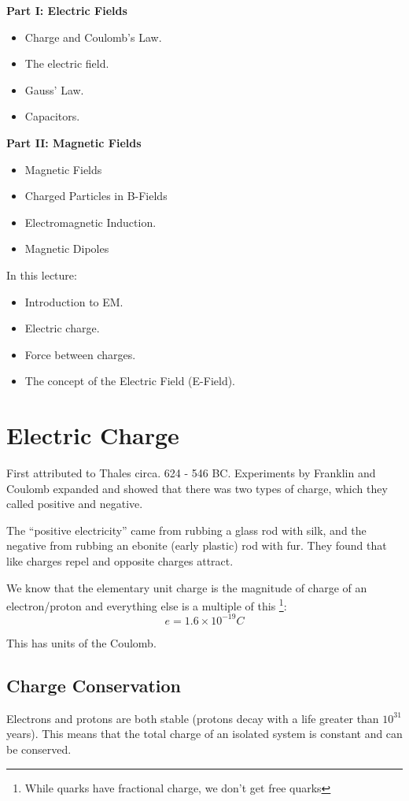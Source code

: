 \textbf{Part I: Electric Fields}
\begin{itemize}
    \item Charge and Coulomb's Law.
    \item The electric field.
    \item Gauss' Law.
    \item Capacitors.
\end{itemize}


\textbf{Part II: Magnetic Fields}

\begin{itemize}
    \item Magnetic Fields
    \item Charged Particles in B-Fields
    \item Electromagnetic Induction.
    \item Magnetic Dipoles
\end{itemize}

In this lecture:
\begin{itemize}
    \item Introduction to EM.
    \item Electric charge.
    \item Force between charges.
    \item The concept of the Electric Field (E-Field).
\end{itemize}

\section{Electric Charge}
First attributed to Thales circa. 624 - 546 BC. Experiments by Franklin and Coulomb expanded and showed that there was two types of charge, which they called positive and negative.

The ``positive electricity'' came from rubbing a glass rod with silk, and the negative from rubbing an ebonite (early plastic) rod with fur. They found that like charges repel and opposite charges attract.

We know that the elementary unit charge is the magnitude of charge of an electron/proton and everything else is a multiple of this \footnote{While quarks have fractional charge, we don't get free quarks}:
\[
    e = 1.6 \times 10^{-19}C
\]

This has units of the Coulomb.

\subsection{Charge Conservation}
Electrons and protons are both stable (protons decay with a life greater than $10^{31}$ years). This means that the total charge of an isolated system is constant and can be conserved.

